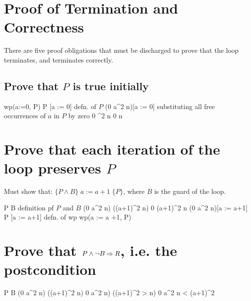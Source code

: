\documentclass[runningheads,12pt]{article}
\begin{document}

\section{Proof of Termination and Correctness}

There are five proof obligations that must be discharged to prove that the loop terminates, and terminates correctly. 

\subsection{ Prove that $P$ is true initially}
	
\begin{calculation}
	wp(a:=0, P)
	P [a := 0]
\hint{=} {defn. of $P$}
	(0 \leq a^2 \leq n)[a := 0]
\hint{=} {substituting all free occurrences of $a$ in $P$ by zero}
	0 ^2 \leq n
	0 \leq n
\end{calculation}

\section{Prove that each iteration of the loop preserves $P$}

Must show that: $\{P \land B\}\; a := a + 1 \;\{P\}$, where $B$ is the guard of the loop. 
	
\begin{calculation}
	P \land B
\hint{=} {definition pf $P$ and $B$}
	(0 \leq a^2 \leq n) \land ((a+1)^2 \leq n)
	0 \leq (a+1)^2 \leq n
	(0 \leq a^2 \leq n)[a := a+1]
	P [a := a+1]
\hint{=} {defn. of wp}
	wp(a := a +1, P)
\end{calculation}


\section{Prove that $P \land \lnot B \mathbin\Rightarrow R$, i.e. the postcondition} 
	
\begin{calculation}
	P \land \lnot B
	 (0 \leq a^2 \leq n) \land \lnot ((a+1)^2 \leq n)
	0 \leq a^2 \leq n) \land ((a+1)^2 > n)
	0 \leq a^2 \leq n < (a+1)^2
\end{calculation}
\end{document}
